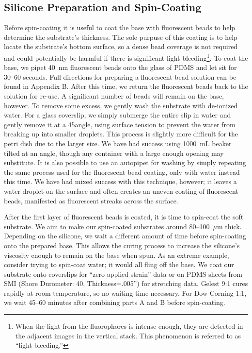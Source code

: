 \subsection{Silicone Preparation and Spin-Coating}
Before spin-coating it is useful to coat the base with fluorescent beads to help determine the substrate's thickness. The sole purpuse of this coating is to help locate the substrate's bottom surface, so a dense bead coverage is not required and could potentially be harmful if there is significant light bleeding\footnote{When the light from the fluorophores is intense enough, they are detected in the adjacent images in the vertical stack. This phenomenon is referred to as ``light bleeding.''}. To coat the base, we pipet 40~nm fluorescent beads onto the glass of PDMS and let sit for 30--60 seconds. Full directions for preparing a fluorescent bead solution can be found in Appendix B. After this time, we return the fluorescent beads back to the solution for re-use. A significant number of beads will remain on the base, however. To remove some excess, we gently wash the substrate with de-ionized water. For a glass coverslip, we simply submerge the entire slip in water and gently remove it at a 45\degree angle, using surface tension to prevent the water from breaking up into smaller droplets. This process is slightly more difficult for the petri dish due to the larger size. We have had success using 1000~mL beaker tilted at an angle, though any container with a large enough opening may substitute. It is also possible to use an autopipet for washing by simply repeating the same process used for the fluorescent bead coating, only with water instead this time. We have had mixed success with this technique, however; it leaves a water droplet on the surface and often creates an uneven coating of fluorescent beads, manifested as fluorescent streaks across the surface.

After the first layer of fluorescent beads is coated, it is time to spin-coat the soft substrate. We aim to make our spin-coated substrates around  80--100~$\mu$m thick. Depending on the silicone, we wait a different amount of time before spin-coating onto the prepared base. This allows the curing process to increase the silicone's viscosity enough to remain on the base when spun. As an extreme example, consider trying to spin-coat water; it would all fling off the base. We coat our substrate onto coverslips for ``zero applied strain'' data or on PDMS sheets from SMI (Shore Durometer: 40, Thickness=.005'') for stretching data. Gelest 9:1 cures rapidly at room temperature, so no waiting time necessary. For Dow Corning 1:1, we wait 45--60 minutes after combining parts A and B before spin-coating.


